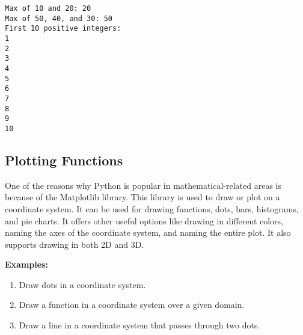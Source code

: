 \documentclass[11pt]{article}
\begin{document}
    \begin{Verbatim}[commandchars=\\\{\}]
Max of 10 and 20: 20
Max of 50, 40, and 30: 50
First 10 positive integers:
1
2
3
4
5
6
7
8
9
10
    \end{Verbatim}

    \subsection{Plotting Functions}\label{plotting-functions}

One of the reasons why Python is popular in mathematical-related areas
is because of the Matplotlib library. This library is used to draw or
plot on a coordinate system. It can be used for drawing functions, dots,
bars, histograms, and pie charts. It offers other useful options like
drawing in different colors, naming the axes of the coordinate system,
and naming the entire plot. It also supports drawing in both 2D and 3D.

\textbf{Examples:}

\begin{enumerate}
\def\labelenumi{\arabic{enumi}.}
\item
  Draw dots in a coordinate system.
\item
  Draw a function in a coordinate system over a given domain.
\item
  Draw a line in a coordinate system that passes through two dots.
\end{enumerate}
\end{document}
